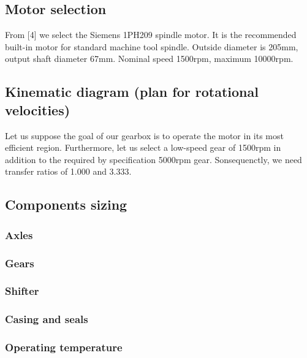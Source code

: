 \documentclass{article}
\begin{document}
\FPeval{}
\vExample

\subsection{Motor selection}
From [4] we select the Siemens 1PH209 spindle motor.
It is the recommended built-in motor for standard machine tool spindle.
Outside diameter is 205mm, output shaft diameter 67mm.
Nominal speed 1500rpm, maximum 10000rpm.

\subsection{Kinematic diagram (plan for rotational velocities)}
Let us suppose the goal of our gearbox is to operate the motor in its most efficient region.
Furthermore, let us select a low-speed gear of 1500rpm in addition to the required by specification 5000rpm gear.
Sonsequenctly, we need transfer ratios of 1.000 and 3.333.

\subsection{Components sizing}
\subsubsection{Axles}
\subsubsection{Gears}
\subsubsection{Shifter}
\subsubsection{Casing and seals}
\subsubsection{Operating temperature}
\end{document}

